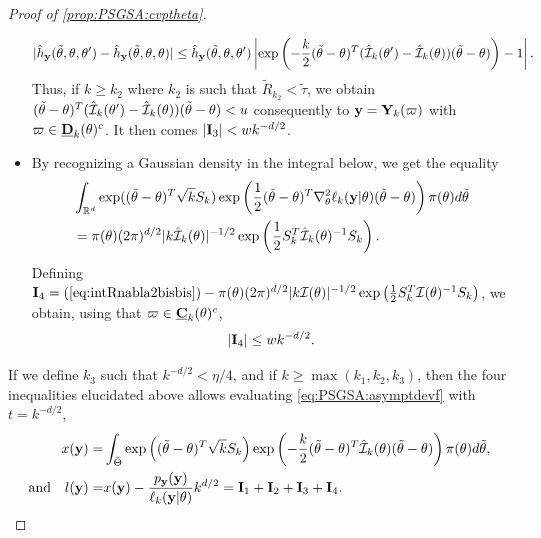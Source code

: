 \begin{proof}[Proof of \cref{prop:PSGSA:cvptheta}]
\begin{itemize}
            \begin{align}   
                 |\hat h_{\mathbf{y}}(\tilde\theta,\theta,\theta') - \hat h_{\mathbf{y}}(\tilde\theta,\theta,\theta) | 
                    \leq \hat h_{\mathbf{y}}(\tilde\theta,\theta,\theta')\left|\exp\left( -\frac{k}{2}(\tilde\theta-\theta)^T(\hat{\mathcal{I}}_k(\theta')-\hat{\mathcal{I}}_k(\theta))(\tilde\theta-\theta) \right)-1\right|.
            \end{align}
        Thus, if $k\geq k_2$ where $k_2$ is such that $\tilde R_{k_2}<\tilde\tau$, we obtain $(\tilde\theta-\theta)^T(\hat{\mathcal{I}}_k(\theta')-\hat{\mathcal{I}}_k(\theta))(\tilde\theta-\theta) < u$ consequently to $\mathbf{y}=\mathbf{Y}_k(\varpi)$ with $\varpi\in\underline{\mathbf{D}}_k(\theta)^c$. 
        It then comes $|\mathbf{I}_3|< w k^{-d/2}$.

        \item  By recognizing a Gaussian density in the integral below, we get the equality 
        \begin{align}
        \nonumber
            &\int_{\mathbb{R}^d}\exp((\tilde\theta-\theta)^T\sqrt{k}S_k)\exp\left(\frac{1}{2}(\tilde\theta-\theta)^T\nabla_\theta^2\ell_k(\mathbf{y}|\theta)(\tilde\theta-\theta)\right)\pi(\theta)d\tilde\theta \\
            &=
            \pi(\theta)(2\pi)^{d/2}|k\hat{\mathcal{I}}_k(\theta)|^{-1/2}\exp\left(\frac{1}{2}S_k^T\hat{\mathcal{I}}_k(\theta)^{-1}S_k\right).
            \label{eq:intRnabla2bisbis}
        \end{align}
        Defining $\mathbf{I}_4= (\ref{eq:intRnabla2bisbis}) - \pi(\theta)(2\pi)^{d/2}|k\mathcal{I}(\theta)|^{-1/2}\exp\left(\frac{1}{2}S_k^T\mathcal{I}(\theta)^{-1}S_k\right)$, we obtain,
        using that $\varpi\in \underline{\mathbf{C}}_k(\theta)^c$, 
        \begin{equation}
            |\mbf I_4|  %
            \leq w k^{-d/2}.
        \end{equation}
    \end{itemize}

If we define $k_3$ such that $k^{-d/2}<\eta/4$, and if $k\geq\max(k_1,k_2,k_3)$, then the four inequalities elucidated above allows evaluating \cref{eq:PSGSA:asymptdevf} with $t=k^{-d/2}$,
\begin{equation}
    \begin{aligned}
    x(\mathbf{y}) = & \int_{\tilde\Theta} \exp\left((\tilde\theta-\theta)^T\sqrt{k}S_k\right)\exp\left( -\frac{k}{2}(\tilde\theta-\theta)^T\hat{\mathcal{I}}_k(\theta)(\tilde\theta-\theta) \right)\pi(\theta )d\tilde\theta,\\
        \text{and}\quad l(\mathbf{y}) =& x(\mathbf{y})-\frac{p_{\mathbf{y}}(\mathbf{y})}{\ell_k(\mathbf{y}|\theta)}k^{d/2} = \mathbf{I}_1+\mathbf{I}_2+\mathbf{I}_3+\mathbf{I}_4.
    \end{aligned}
\end{equation}


\end{proof}
